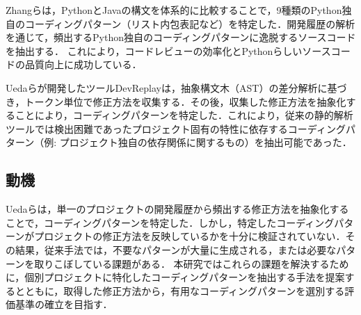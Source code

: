 \documentclass[submit,techrep,noauthor]{ipsj}
\begin{document}
Zhangらは，PythonとJavaの構文を体系的に比較することで，9種類のPython独自のコーディングパターン（リスト内包表記など）を特定した．開発履歴の解析を通じて，頻出するPython独自のコーディングパターンに逸脱するソースコードを抽出する．
これにより，コードレビューの効率化とPythonらしいソースコードの品質向上に成功している．

Uedaらが開発したツールDevReplay\cite{devreplay}は，抽象構文木（AST）の差分解析に基づき，トークン単位で修正方法を収集する．その後，収集した修正方法を抽象化することにより，コーディングパターンを特定した．これにより，従来の静的解析ツールでは検出困難であったプロジェクト固有の特性に依存するコーディングパターン（例: プロジェクト独自の依存関係に関するもの）を抽出可能であった．

\subsection{動機}
Uedaらは，単一のプロジェクトの開発履歴から頻出する修正方法を抽象化することで，コーディングパターンを特定した．しかし，特定したコーディングパターンがプロジェクトの修正方法を反映しているかを十分に検証されていない．その結果，従来手法では，不要なパターンが大量に生成される，または必要なパターンを取りこぼしている課題がある．
本研究ではこれらの課題を解決するために，個別プロジェクトに特化したコーディングパターンを抽出する手法を提案するとともに，取得した修正方法から，有用なコーディングパターンを選別する評価基準の確立を目指す．

\end{document}
